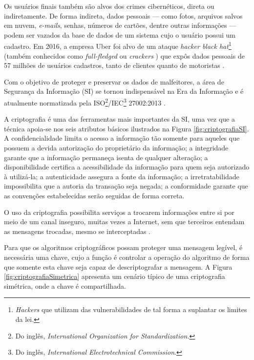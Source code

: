 \documentclass[12pt]{article}
\newcommand{\internet}{Internet\xspace}
\begin{document}
        Os usuários finais também são alvos dos crimes cibernéticos, direta ou indiretamente. De forma indireta, dados pessoais --- como fotos, arquivos salvos em nuvem, \textit{e-mails}, senhas, números de cartões, dentre outras informações --- podem ser vazados da base de dados de um sistema cujo o usuário possui um cadastro. Em 2016, a empresa Uber foi alvo de um ataque \textit{hacker black hat}\footnote{\textit{Hackers} que utilizam das vulnerabilidades de tal forma a suplantar os limites da lei.} (também conhecidos como \textit{full-fledged} ou \textit{crackers} \cite{nakamura2007coorporativos}) que expôs dados pessoais de 57 milhões de usuários cadastros, tanto de clientes quanto de motoristas \cite{globo2017uber}.
    
        Com o objetivo de proteger e preservar os dados de malfeitores, a área de Segurança da Informação (SI) se tornou indispensável na Era da Informação e é atualmente normatizada pela ISO\footnote{Do inglês, \textit{International Organization for Standardization.}}/IEC\footnote{Do inglês, \textit{International Electrotechnical Commission}.} 27002:2013 \cite{iso2013si}.
    
        A criptografia é uma das ferramentas mais importantes da SI, uma vez que a técnica apoia-se nos seis atributos básicos ilustrados na Figura \ref{fig:criptografiaSI}. A confidencialidade limita o acesso a informação tão somente para aqueles que possuem a devida autorização do proprietário da informação; a integridade garante que a informação permaneça isenta de qualquer alteração; a disponibilidade certifica a acessibilidade da informação para quem seja autorizado à utilizá-la; a autenticidade assegura a fonte da informação; a irretratabilidade impossibilita que a autoria da transação seja negada; a conformidade garante que as convenções estabelecidas serão seguidas de forma correta.
    
        
    
        O uso da criptografia possibilita serviços a trocarem informações entre si por meio de um canal inseguro, muitas vezes a \internet, sem que terceiros entendam as mensagens trocadas, mesmo se interceptadas \cite{stinson2006cryptography}.
    
        Para que os algoritmos criptográficos possam proteger uma mensagem legível, é necessária uma chave, cujo a função é controlar a operação do algoritmo de forma que somente esta chave seja capaz de descriptografar a mensagem. A Figura \ref{fig:criptografiaSimetrica} apresenta um cenário típico de uma criptografia simétrica, onde a chave é compartilhada.
    
\end{document}
